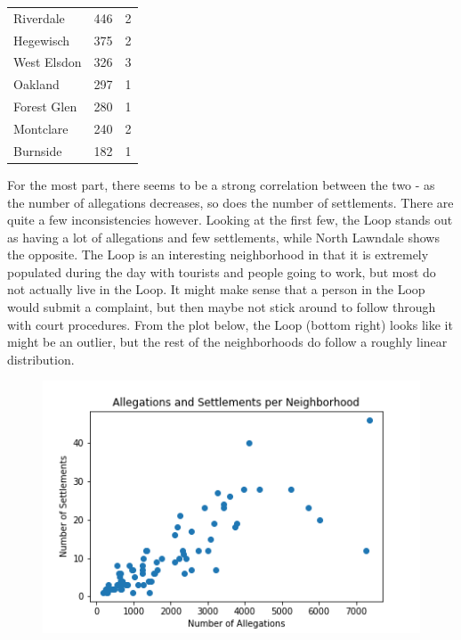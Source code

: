 \documentclass{article}
\begin{document}
\begin{table}[h!]
\begin{tabular}{|l|l|l|}
Riverdale              & 446              & 2                \\
Hegewisch              & 375              & 2                \\
West Elsdon            & 326              & 3                \\
Oakland                & 297              & 1                \\
Forest Glen            & 280              & 1                \\
Montclare              & 240              & 2                \\
Burnside               & 182              & 1               \\
\hline
\end{tabular}
\end{table}

For the most part, there seems to be a strong correlation between the two - as the number of allegations decreases, so does the number of settlements. There are quite a few inconsistencies however. Looking at the first few, the Loop stands out as having a lot of allegations and few settlements, while North Lawndale shows the opposite. The Loop is an interesting neighborhood in that it is extremely populated during the day with tourists and people going to work, but most do not actually live in the Loop. It might make sense that a person in the Loop would submit a complaint, but then maybe not stick around to follow through with court procedures. From the plot below, the Loop (bottom right) looks like it might be an outlier, but the rest of the neighborhoods do follow a roughly linear distribution.

\begin{figure}[h!]
\includegraphics[width=\textwidth]{alleg_scatter.png}
\end{figure}
\end{document}
